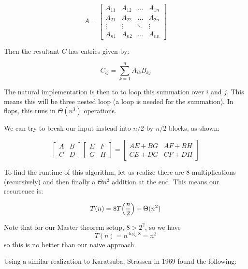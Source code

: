 \[ A = \begin{bmatrix}
    A_{11}& A_{12}& \ldots& A_{1n} \\
    A_{21}& A_{22} & \ldots & A_{2n} \\
    \vdots& \vdots & \ddots & \vdots \\
    A_{n1} & A_{n2} & \ldots & A_{nn}
\end{bmatrix} \]

Then the resultant $C$ has entries given by:

\[ C_{ij} = \sum_{k = 1}^n A_{ik} B_{kj} \]

The natural implementation is then to to loop this summation over $i$
and $j$. This means this will be three nested loop (a loop is needed for the summation).
In flops, this runs in $\Theta(n^3)$ operations.

We can try to break our input instead into $n / 2$-by-$n / 2$ blocks, as shown:

\[ \begin{bmatrix}
    A & B \\
    C & D
\end{bmatrix} \begin{bmatrix}
    E & F \\
    G & H
\end{bmatrix} = \begin{bmatrix}
    AE + BG & AF + BH \\
    CE + DG & CF + DH
\end{bmatrix} \]

To find the runtime of this algorithm, let us realize there are
8 multiplications (recursively) and then finally a $\Theta{n^2}$ addition at the end.
This means our recurrence is:

\[ T(n) = 8 T\qty(\frac{n}{2}) + \Theta(n^2) \]

Note that for our Master theorem setup, $8 > 2^2$, so we have
\[ T(n) = n^{\log_2{8}} = n^3 \]
so this is no better than our naive approach.

Using a similar realization to Karatsuba, Strassen in 1969 found the following:


